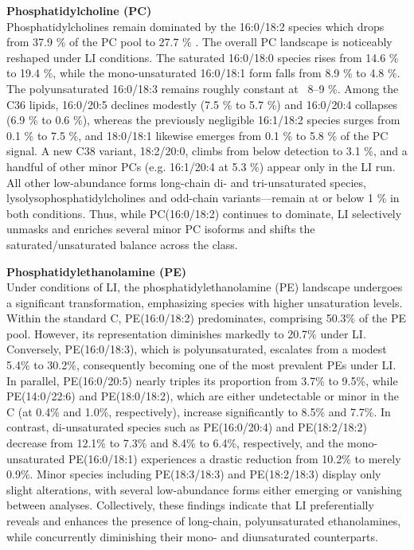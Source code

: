 \documentclass[10pt,letterpaper]{article}
\begin{document}
\textbf{Phosphatidylcholine (PC)} \\ 
Phosphatidylcholines remain dominated by the 16:0/18:2 species which drops from 37.9 \% of the PC pool to 27.7 \% . The overall PC landscape is noticeably reshaped under LI conditions. The saturated 16:0/18:0 species rises from 14.6 \% to 19.4 \%, while the mono-unsaturated 16:0/18:1 form falls from 8.9 \% to 4.8 \%. The polyunsaturated 16:0/18:3 remains roughly constant at ~8–9 \%. Among the C36 lipids, 16:0/20:5 declines modestly (7.5 \% to 5.7 \%) and 16:0/20:4 collapses (6.9 \% to 0.6 \%), whereas the previously negligible 16:1/18:2 species surges from 0.1 \% to 7.5 \%, and 18:0/18:1 likewise emerges from 0.1 \% to 5.8 \% of the PC signal. A new C38 variant, 18:2/20:0, climbs from below detection to 3.1 \%, and a handful of other minor PCs (e.g. 16:1/20:4 at 5.3 \%) appear only in the LI run. All other low-abundance forms long-chain di- and tri-unsaturated species, lysolysophosphatidylcholines and odd-chain variants—remain at or below 1 \% in both conditions. Thus, while PC(16:0/18:2) continues to dominate, LI selectively unmasks and enriches several minor PC isoforms and shifts the saturated/unsaturated balance across the class.


\textbf{Phosphatidylethanolamine (PE)}  \\
Under conditions of LI, the phosphatidylethanolamine (PE) landscape undergoes a significant transformation, emphasizing species with higher unsaturation levels. Within the standard C, PE(16:0/18:2) predominates, comprising 50.3\% of the PE pool. However, its representation diminishes markedly to 20.7\% under LI. Conversely, PE(16:0/18:3), which is polyunsaturated, escalates from a modest 5.4\% to 30.2\%, consequently becoming one of the most prevalent PEs under LI. In parallel, PE(16:0/20:5) nearly triples its proportion from 3.7\% to 9.5\%, while PE(14:0/22:6) and PE(18:0/18:2), which are either undetectable or minor in the C (at 0.4\% and 1.0\%, respectively), increase significantly to 8.5\% and 7.7\%. In contrast, di-unsaturated species such as PE(16:0/20:4) and PE(18:2/18:2) decrease from 12.1\% to 7.3\% and 8.4\% to 6.4\%, respectively, and the mono-unsaturated PE(16:0/18:1) experiences a drastic reduction from 10.2\% to merely 0.9\%. Minor species including PE(18:3/18:3) and PE(18:2/18:3) display only slight alterations, with several low-abundance forms either emerging or vanishing between analyses. Collectively, these findings indicate that LI preferentially reveals and enhances the presence of long-chain, polyunsaturated ethanolamines, while concurrently diminishing their mono- and diunsaturated counterparts.
\end{document}
